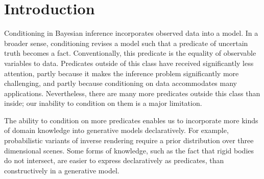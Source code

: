 
\section{Introduction}

Conditioning in Bayesian inference incorporates observed data into a model.
In a broader sense, conditioning revises a model such that a predicate of uncertain truth becomes a fact.
Conventionally, this predicate is the equality of observable variables to data.
Predicates outside of this class have received significantly less attention, partly because it makes the inference problem significantly more challenging, and partly because conditioning on data accommodates many applications.
Nevertheless, there are many more predicates outside this class than inside; our inability to condition on them is a major limitation.

The ability to condition on more predicates enables us to incorporate more kinds of domain knowledge into generative models declaratively.
For example, probabilistic variants of inverse rendering  \cite{marschner1998inverse,kulkarni2015deep} require a prior distribution over three dimensional scenes.
Some forms of knowledge, such as the fact that rigid bodies do not intersect, are easier to express declaratively as predicates, than constructively in a generative model.


